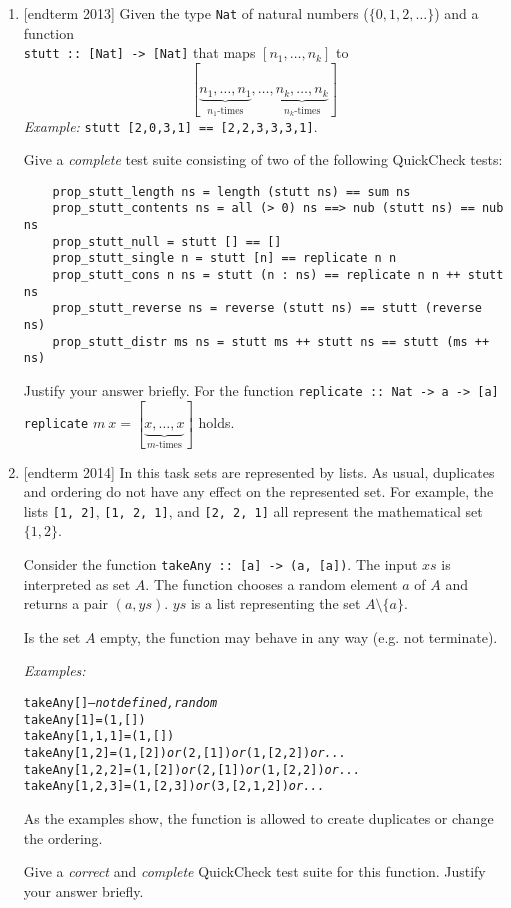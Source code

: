 \documentclass{article}
\def\code#1{\texttt{#1}}
\begin{document}
\begin{enumerate}
\item {[endterm 2013]} Given the type \verb|Nat| of natural numbers ($\{0,1,2,\dots\}$) and a function \\ \verb|stutt :: [Nat] -> [Nat]| that maps $[n_1, \dots, n_k]$ to
\[
[\underbrace{n_1, \dots, n_1}_{n_1\text{-times}}, \dots, \underbrace{n_k, \dots, n_k}_{n_k\text{-times}}]
\]
\textit{Example:} \verb|stutt [2,0,3,1] == [2,2,3,3,3,1]|. \par
Give a \textit{complete} test suite consisting of two of the following QuickCheck tests:
\begin{verbatim}
    prop_stutt_length ns = length (stutt ns) == sum ns
    prop_stutt_contents ns = all (> 0) ns ==> nub (stutt ns) == nub ns
    prop_stutt_null = stutt [] == []
    prop_stutt_single n = stutt [n] == replicate n n
    prop_stutt_cons n ns = stutt (n : ns) == replicate n n ++ stutt ns
    prop_stutt_reverse ns = reverse (stutt ns) == stutt (reverse ns)
    prop_stutt_distr ms ns = stutt ms ++ stutt ns == stutt (ms ++ ns)
\end{verbatim}
Justify your answer briefly. For the function \verb|replicate :: Nat -> a -> [a] replicate| $m\ x = [\underbrace{x, \dots, x}_{m\text{-times}}]$ holds.

\item {[endterm 2014]} In this task sets are represented by lists. As usual, duplicates and ordering do not have any effect on the represented set. For example, the lists \code{[1, 2]}, \code{[1, 2, 1]}, and \code{[2, 2, 1]} all represent the mathematical set $\{1, 2\}$. \par
Consider the function \code{takeAny :: [a] -> (a, [a])}. The input $xs$ is interpreted as set $A$. The function chooses a random element $a$ of $A$ and returns a pair $(a, ys)$. $ys$ is a list representing the set $A \setminus \{a\}$. \par
Is the set $A$ empty, the function may behave in any way (e.g. not terminate). \par
\textit{Examples:}
\begin{alltt}
    takeAny []                      \textit{-- not defined, random}
    takeAny [1] = (1 ,[])
    takeAny [1 ,1 ,1] = (1 ,[])
    takeAny [1 ,2] = (1 ,[2]) \textit{or} (2 ,[1]) \textit{or} (1 ,[2 ,2]) \textit{or ...}
    takeAny [1 ,2 ,2] = (1 ,[2]) \textit{or} (2 ,[1]) \textit{or} (1 ,[2 ,2]) \textit{or ...}
    takeAny [1 ,2 ,3] = (1 ,[2 ,3]) \textit{or} (3 ,[2 ,1 ,2]) \textit{or ...}
\end{alltt}
As the examples show, the function is allowed to create duplicates or change the ordering. \par
Give a \textit{correct} and \textit{complete} QuickCheck test suite for this function. Justify your answer briefly.


\end{enumerate}
\end{document}
